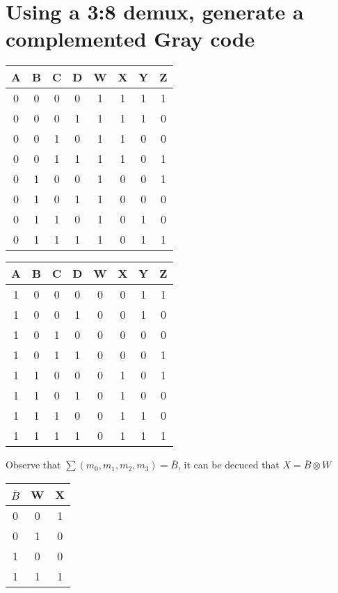 \documentclass{article}
\begin{document}
\pagebreak

\section{Using a 3:8 demux, generate a complemented Gray code}

\begin{table}[H]
    \centering
    \begin{tabular}{cccc|cccc}
        \toprule
        A&B&C&D&W&X&Y&Z\\
        \midrule
        0&0&0&0&1&1&1&1\\
        0&0&0&1&1&1&1&0\\
        0&0&1&0&1&1&0&0\\
        0&0&1&1&1&1&0&1\\
        0&1&0&0&1&0&0&1\\
        0&1&0&1&1&0&0&0\\
        0&1&1&0&1&0&1&0\\
        0&1&1&1&1&0&1&1\\
        \bottomrule
    \end{tabular}
    \quad
    \begin{tabular}{cccc|cccc}
        \toprule
        A&B&C&D&W&X&Y&Z\\
        \midrule
        1&0&0&0&0&0&1&1\\
        1&0&0&1&0&0&1&0\\
        1&0&1&0&0&0&0&0\\
        1&0&1&1&0&0&0&1\\
        1&1&0&0&0&1&0&1\\
        1&1&0&1&0&1&0&0\\
        1&1&1&0&0&1&1&0\\
        1&1&1&1&0&1&1&1\\
        \bottomrule
    \end{tabular}
\end{table}
Observe that $\sum(m_0,m_1,m_2,m_3)=\overline{B}$, it can be decuced that $X=\overline{B}\otimes W$
\begin{table}[H]
    \centering
    \begin{tabular}{cc|c}
        \toprule
        $\overline{B}$&W&X\\
        \midrule
        0&0&1\\
        0&1&0\\
        1&0&0\\
        1&1&1\\
        \bottomrule
    \end{tabular}
\end{table}
\end{document}
